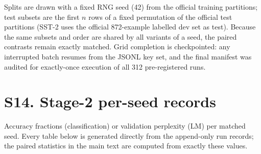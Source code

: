 \documentclass[10pt,a4paper]{article}
\begin{document}
Splits are drawn with a fixed RNG seed (42) from the official training
partitions; test subsets are the first $n$ rows of a fixed permutation of the
official test partitions (SST-2 uses the official 872-example labelled dev set
as test). Because the same subsets and order are shared by all variants of a
seed, the paired contrasts remain exactly matched. Grid completion is
checkpointed: any interrupted batch resumes from the JSONL key set, and the
final manifest was audited for exactly-once execution of all 312
pre-registered runs.

\section*{S14. Stage-2 per-seed records}\label{sup:perseeds2}

Accuracy fractions (classification) or validation perplexity (LM) per matched
seed. Every table below is generated directly from the append-only run records;
the paired statistics in the main text are computed from exactly these values.
\end{document}
